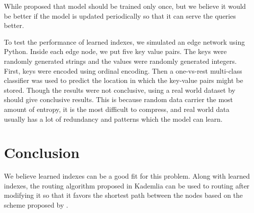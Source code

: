 While \citet{kraska2018} proposed that model should be trained only once, but we
believe it would be better if the model is updated periodically so that it can
serve the queries better.

To test the performance of learned indexes, we simulated an edge network using
Python. Inside each edge node, we put five key value pairs. The keys were
randomly generated strings and the values were randomly generated integers.
First, keys were encoded using ordinal encoding. Then a one-vs-rest multi-class
classifier was used to predict the location in which the key-value pairs might be
stored. Though the results were not conclusive, using a real world dataset by
\citet{taxi&limousinecommissionNewYorkTaxi} should give conclusive results. This
is because random data carrier the most amount of entropy, it is the most
difficult to compress, and real world data usually has a lot of redundancy and
patterns which the model can learn.

\section{Conclusion}

We believe learned indexes can be a good fit for this problem. Along with
learned indexes, the routing algorithm proposed in Kademlia can be used to
routing after modifying it so that it favors the shortest path between the nodes
based on the scheme proposed by \citet{mengweiImprovementKademliaBased2013}.